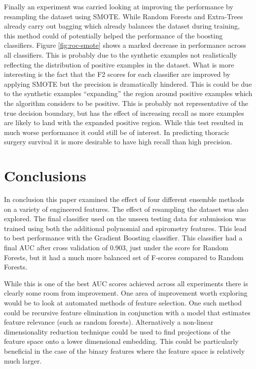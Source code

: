 \documentclass[journal]{IEEEtran}
\begin{document}
Finally an experiment was carried looking at improving the performance by resampling the dataset using SMOTE. While Random Forests and Extra-Trees already carry out bagging which already balances the dataset during training, this method could of potentially helped the performance of the boosting classifiers. Figure \ref{fig:roc-smote} shows a marked decrease in performance across all classifiers. This is probably due to the synthetic examples not realistically reflecting the distribution of positive examples in the dataset. What is more interesting is the fact that the F2 scores for each classifier are improved by applying SMOTE but the precision is dramatically hindered. This is could be due to the synthetic examples ``expanding'' the region around positive examples which the algorithm considers to be positive. This is probably not representative of the true decision boundary, but has the effect of increasing recall as more examples are likely to land with the expanded positive region. While this test resulted in much worse performance it could still be of interest. In predicting thoracic surgery survival it is more desirable to have high recall than high precision.


\section{Conclusions}
\label{sec:conclusions}
In conclusion this paper examined the effect of four different ensemble methods on a variety of engineered features. The effect of resampling the dataset was also explored. The final classifier used on the unseen testing data for submission was trained using both the additional polynomial and spirometry features. This lead to best performance with the Gradient Boosting classifier. This classifier had a final AUC after cross validation of 0.903, just under the score for Random Forests, but it had a much more balanced set of F-scores compared to Random Forests.

While this is one of the best AUC scores achieved across all experiments there is clearly some room from improvement. One area of improvement worth exploring would be to look at automated methods of feature selection. One such method could be recursive feature elimination in conjunction with a model that estimates feature relevance (such as random forests). Alternatively a non-linear dimensionality reduction technique could be used to find projections of the feature space onto a lower dimensional embedding. This could be particularly beneficial in the case of the binary features where the feature space is relatively much larger. 
\end{document}
